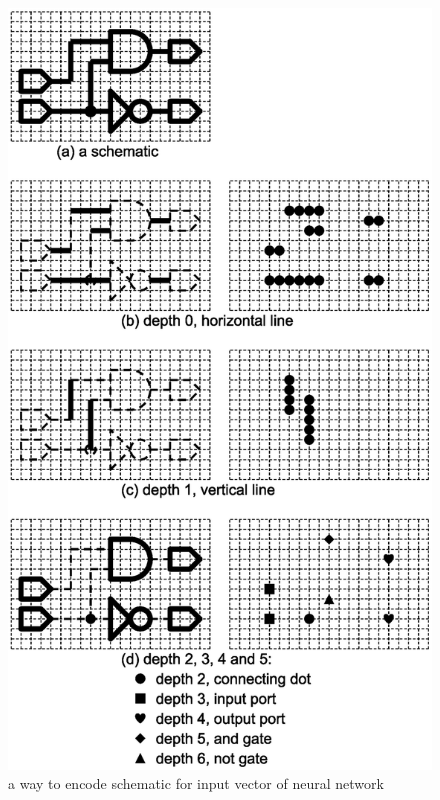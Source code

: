 \documentclass[twocolumn]{article}
\begin{document}
\begin{figure}[!tp]
 \begin{center}
  \begin{minipage}{\hsize}
   \includegraphics[width=\hsize]{input_encode_03.eps}
   \caption{a way to encode schematic for input vector of neural network}
   \label{fig:input_encode}
  \end{minipage}
 \end{center}
\end{figure}
\end{document}
